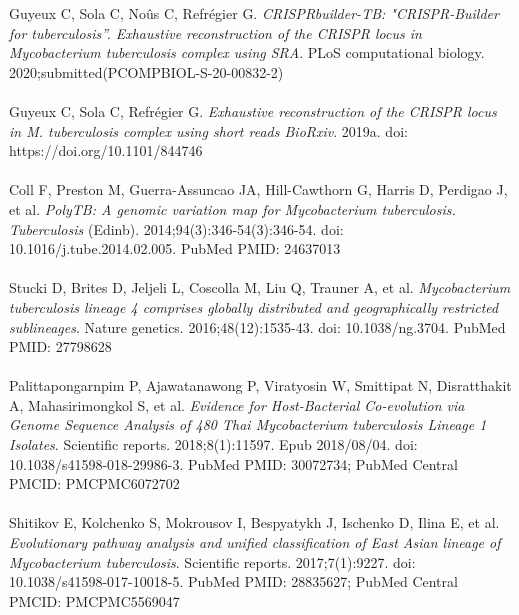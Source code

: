 \documentclass[twoside,a4paper,11pt,frenchb,openany]{report}
\begin{document}
\begin{spacing}{0.5}

\renewcommand{\bibname}{Références}
\begin{thebibliography}{10}

Guyeux C, Sola C, Noûs C, Refrégier G. \textit{CRISPRbuilder-TB:
"CRISPR-Builder for tuberculosis''. Exhaustive reconstruction of the
CRISPR locus in Mycobacterium tuberculosis complex using SRA}. PLoS
computational biology. 2020;submitted(PCOMPBIOL-S-20-00832-2)\\ \\

Guyeux C, Sola C, Refrégier G. \textit{Exhaustive reconstruction of the
CRISPR locus in M. tuberculosis complex using short reads BioRxiv}.
2019a. doi: https://doi.org/10.1101/844746\\ \\

 Coll F, Preston M, Guerra-Assuncao JA, Hill-Cawthorn G, Harris D,
Perdigao J, et al. \textit{PolyTB: A genomic variation map for Mycobacterium
tuberculosis. Tuberculosis} (Edinb). 2014;94(3):346-54(3):346-54. doi:
10.1016/j.tube.2014.02.005. PubMed PMID: 24637013\\ \\

Stucki D, Brites D, Jeljeli L, Coscolla M, Liu Q, Trauner A, et al.
\textit{Mycobacterium tuberculosis lineage 4 comprises globally distributed and
geographically restricted sublineages}. Nature genetics.
2016;48(12):1535-43. doi: 10.1038/ng.3704. PubMed PMID: 27798628\\ \\

Palittapongarnpim P, Ajawatanawong P, Viratyosin W, Smittipat N,
Disratthakit A, Mahasirimongkol S, et al. \textit{Evidence for Host-Bacterial
Co-evolution via Genome Sequence Analysis of 480 Thai Mycobacterium
tuberculosis Lineage 1 Isolates}. Scientific reports. 2018;8(1):11597.
Epub 2018/08/04. doi: 10.1038/s41598-018-29986-3. PubMed PMID: 30072734;
PubMed Central PMCID: PMCPMC6072702\\ \\

Shitikov E, Kolchenko S, Mokrousov I, Bespyatykh J, Ischenko D, Ilina E, et al. \textit{Evolutionary pathway analysis and unified classification of
East Asian lineage of Mycobacterium tuberculosis}. Scientific reports.
2017;7(1):9227. doi: 10.1038/s41598-017-10018-5. PubMed PMID: 28835627;
PubMed Central PMCID: PMCPMC5569047\\ \\


\end{thebibliography}
\end{spacing}
\end{document}
